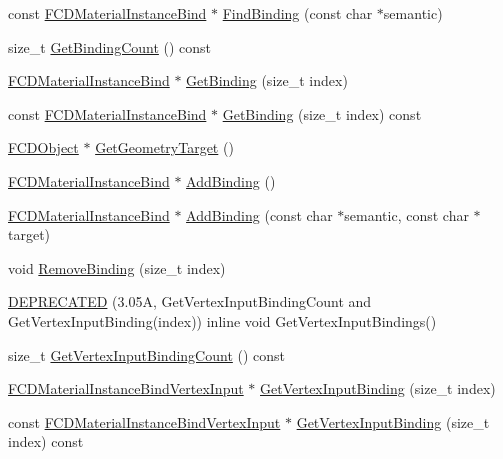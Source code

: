 \begin{DoxyCompactItemize}
\item 
const \hyperlink{classFCDMaterialInstanceBind}{FCDMaterialInstanceBind} $\ast$ \hyperlink{classFCDMaterialInstance_a41a476a7b82d8406b8bdd321612d041f}{FindBinding} (const char $\ast$semantic)
\item 
size\_\-t \hyperlink{classFCDMaterialInstance_aad2749897b63b5ccb090dc2f3e2b6b95}{GetBindingCount} () const 
\item 
\hyperlink{classFCDMaterialInstanceBind}{FCDMaterialInstanceBind} $\ast$ \hyperlink{classFCDMaterialInstance_a2b1e047084ed5191337e369733b74641}{GetBinding} (size\_\-t index)
\item 
const \hyperlink{classFCDMaterialInstanceBind}{FCDMaterialInstanceBind} $\ast$ \hyperlink{classFCDMaterialInstance_a8adfe57c81d757c46d1598f782079090}{GetBinding} (size\_\-t index) const 
\item 
\hyperlink{classFCDObject}{FCDObject} $\ast$ \hyperlink{classFCDMaterialInstance_a855175cc0d660ed54e5c87b33229f969}{GetGeometryTarget} ()
\item 
\hyperlink{classFCDMaterialInstanceBind}{FCDMaterialInstanceBind} $\ast$ \hyperlink{classFCDMaterialInstance_acfaa4897f0acf6d89bd62bfcc7690760}{AddBinding} ()
\item 
\hyperlink{classFCDMaterialInstanceBind}{FCDMaterialInstanceBind} $\ast$ \hyperlink{classFCDMaterialInstance_a7f4dafda2db965c0841e62be86280701}{AddBinding} (const char $\ast$semantic, const char $\ast$target)
\item 
void \hyperlink{classFCDMaterialInstance_a80cf10dc7af55794335d3ac676373cda}{RemoveBinding} (size\_\-t index)
\item 
\hyperlink{classFCDMaterialInstance_a8665a75d8a9fbe2d8f2c882a7a6d48cb}{DEPRECATED} (3.05A, GetVertexInputBindingCount and GetVertexInputBinding(index)) inline void GetVertexInputBindings()
\item 
size\_\-t \hyperlink{classFCDMaterialInstance_afaf92b900b38ecacc565a2823a9d7639}{GetVertexInputBindingCount} () const 
\item 
\hyperlink{classFCDMaterialInstanceBindVertexInput}{FCDMaterialInstanceBindVertexInput} $\ast$ \hyperlink{classFCDMaterialInstance_a1372de985b79a51a54cc5674b275e60d}{GetVertexInputBinding} (size\_\-t index)
\item 
const \hyperlink{classFCDMaterialInstanceBindVertexInput}{FCDMaterialInstanceBindVertexInput} $\ast$ \hyperlink{classFCDMaterialInstance_a7beb53b836aba0e36f82d251264030c7}{GetVertexInputBinding} (size\_\-t index) const 
\item 

\end{DoxyCompactItemize}
